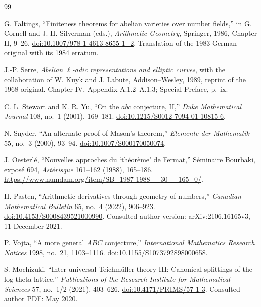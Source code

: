 \begingroup
\begin{thebibliography}{99}
\raggedright
{}
G. Faltings,
``Finiteness theorems for abelian varieties over number fields,''
in G. Cornell and J. H. Silverman (eds.), \emph{Arithmetic Geometry},
Springer, 1986, Chapter II, 9--26.
\href{https://doi.org/10.1007/978-1-4613-8655-1_2}{doi:10.1007/978-1-4613-8655-1\_2}.
Translation of the 1983 German original with its 1984 erratum.


J.-P. Serre,
\emph{Abelian $\ell$-adic representations and elliptic curves},
with the collaboration of W. Kuyk and J. Labute,
Addison--Wesley, 1989, reprint of the 1968 original.
Chapter IV, Appendix A.1.2--A.1.3; Special Preface, p.~ix.



C. L. Stewart and K. R. Yu,
``On the $abc$ conjecture, II,''
\emph{Duke Mathematical Journal} 108, no.~1 (2001), 169--181.
\href{https://doi.org/10.1215/S0012-7094-01-10815-6}{doi:10.1215/S0012-7094-01-10815-6}.

N. Snyder,
``An alternate proof of Mason's theorem,''
\emph{Elemente der Mathematik} 55, no.~3 (2000), 93--94.
\href{https://doi.org/10.1007/S000170050074}{doi:10.1007/S000170050074}.

J. Oesterl\'e,
``Nouvelles approches du `th\'eor\`eme' de Fermat,''
S\'eminaire Bourbaki, expos\'e 694,
\emph{Ast\'erisque} 161--162 (1988), 165--186.
\url{https://www.numdam.org/item/SB_1987-1988__30__165_0/}.

H. Pasten,
``Arithmetic derivatives through geometry of numbers,''
\emph{Canadian Mathematical Bulletin} 65, no.~4 (2022), 906--923.
\href{https://doi.org/10.4153/S0008439521000990}{doi:10.4153/S0008439521000990}.
Consulted author version: arXiv:2106.16165v3, 11 December 2021.

P. Vojta,
``A more general $ABC$ conjecture,''
\emph{International Mathematics Research Notices} 1998, no.~21, 1103--1116.
\href{https://doi.org/10.1155/S1073792898000658}{doi:10.1155/S1073792898000658}.

S. Mochizuki,
``Inter-universal Teichm\"uller theory III: Canonical splittings of the log-theta-lattice,''
\emph{Publications of the Research Institute for Mathematical Sciences}
57, no.~1/2 (2021), 403--626.
\href{https://doi.org/10.4171/PRIMS/57-1-3}{doi:10.4171/PRIMS/57-1-3}.
Consulted author PDF: May 2020.


\end{thebibliography}
